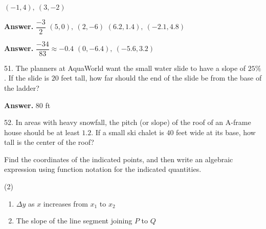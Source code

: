 \documentclass[10pt,]{book}
\theoremstyle{plain}
\theoremstyle{definition}
\theoremstyle{definition}
\theoremstyle{definition}
\theoremstyle{definition}
\numberwithin{equation}{part}
\begin{document}
\begin{exerciselist}
\begin{exercisegroup}
\exercise[47.]\hypertarget{exercise-443}{}\((-1, 4), ~(3, -2)\)%
\par\smallskip
\noindent\textbf{Answer.}\hypertarget{answer-245}{}\quad
\(\dfrac{-3}{2} \)%
\exercise[48.]\hypertarget{exercise-444}{}\((5, 0), ~(2, -6)\)%
\exercise[49.]\hypertarget{exercise-445}{}\((6.2, 1.4), ~(-2.1, 4.8)\)%
\par\smallskip
\noindent\textbf{Answer.}\hypertarget{answer-246}{}\quad
\(\dfrac{-34}{83}\approx-0.4 \)%
\exercise[50.]\hypertarget{exercise-446}{}\((0, -6.4), ~(-5.6, 3.2)\)%
\end{exercisegroup}
\par\smallskip\noindent
\item[51.]\hypertarget{exercise-447}{}The planners at AquaWorld want the small water slide to have a slope of \(25\%\). If the slide is \(20\) feet tall, how far should the end of the slide be from the base of the ladder?%
\par\smallskip
\par\smallskip
\noindent\textbf{Answer.}\hypertarget{answer-247}{}\quad
\(80\) ft%
\item[52.]\hypertarget{exercise-448}{}In areas with heavy snowfall, the pitch (or slope) of the roof of an A-frame house should be at least \(1.2\). If a small ski chalet is \(40\) feet wide at its base, how tall is the center of the roof?%
\par\smallskip
\hypertarget{exercisegroup-60}{}\par\noindent Find the coordinates of the indicated points, and then write an algebraic expression using function notation for the indicated quantities.%
\begin{exercisegroup}(2)
\exercise[53.]\hypertarget{exercise-449}{}\leavevmode%
\begin{enumerate}[label=*\alph**]
\item\hypertarget{li-1619}{}\(\Delta y\) as \(x\) increases from \(x_1\) to \(x_2\)%
\item\hypertarget{li-1620}{}The slope of the line segment joining \(P\) to \(Q\)%
\end{enumerate}

\end{exercisegroup}
\end{exerciselist}
\end{document}
